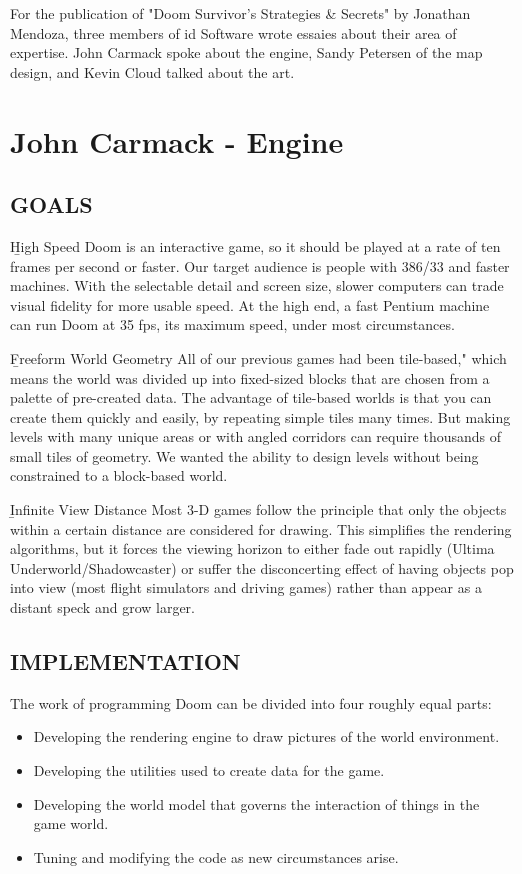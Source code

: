 For the publication of "Doom Survivor's Strategies \& Secrets" by Jonathan Mendoza, three members of id Software wrote essaies about their area of expertise. John Carmack spoke about the engine, Sandy Petersen of the map design, and Kevin Cloud talked about the art.\\
\par
\section{John Carmack - Engine}
\subsection{GOALS}
\b{High Speed} Doom is an interactive game, so it should be played at a rate of ten frames per second or faster. Our target audience is people with 386/33 and faster machines. With the selectable detail and screen size, slower computers can trade visual fidelity for more usable speed. At the high end, a fast Pentium machine can run Doom at 35 fps, its maximum speed, under most circumstances.\\
\par

\b{Freeform World Geometry} All of our previous games had been tile-based," which means the world was divided up into fixed-sized blocks that are chosen from a palette of pre-created data. The advantage of tile-based worlds is that you can create them quickly and easily, by repeating simple tiles many times. But making levels with many unique areas or with angled corridors can require thousands of small tiles of geometry. We wanted the ability to design levels without being constrained to a block-based world.\\
\par 
\b{Infinite View Distance} Most 3-D games
follow the principle that only the objects within a certain distance are considered for drawing.
This simplifies the rendering algorithms, but it forces the viewing horizon to either fade out rapidly (Ultima Underworld/Shadowcaster) or suffer the disconcerting effect of having objects pop into view (most flight simulators and driving games) rather than appear as a distant speck and grow larger.
\par
\subsection{IMPLEMENTATION}
The work of programming Doom can be divided into four roughly
equal parts:
\begin{itemize}
\item Developing the rendering engine
to draw pictures
of the world
environment.
\item Developing the utilities used to create data for the game.
\item Developing the world model that governs
the interaction of
things in the game world.
\item Tuning and modifying
the code as new circumstances arise.
\end{itemize}

